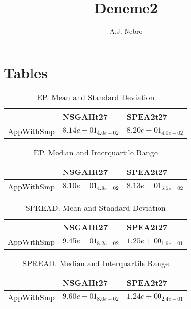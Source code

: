 \documentclass{article}
\title{Deneme2}
\author{A.J. Nebro}
\begin{document}
\maketitle
\section{Tables}

\begin{table}
\caption{EP. Mean and Standard Deviation}
\label{table: EP}
\centering
\begin{scriptsize}
\begin{tabular}{lll}
\hline & NSGAIIt27 &  SPEA2t27\\
\hline 
AppWithSmp & \cellcolor{gray95}$  8.14e-01_{ 4.0e-02}$ & \cellcolor{gray25}$  8.20e-01_{ 4.0e-02}$ \\
\hline
\end{tabular}
\end{scriptsize}
\end{table}

\begin{table}
\caption{EP. Median and Interquartile Range}
\label{table: EP}
\centering
\begin{scriptsize}
\begin{tabular}{lll}
\hline & NSGAIIt27 &  SPEA2t27\\
\hline 
AppWithSmp & \cellcolor{gray95}$  8.10e-01_{ 4.8e-02}$ & \cellcolor{gray25}$  8.13e-01_{ 5.5e-02}$ \\
\hline
\end{tabular}
\end{scriptsize}
\end{table}

\begin{table}
\caption{SPREAD. Mean and Standard Deviation}
\label{table: SPREAD}
\centering
\begin{scriptsize}
\begin{tabular}{lll}
\hline & NSGAIIt27 &  SPEA2t27\\
\hline 
AppWithSmp & \cellcolor{gray95}$  9.45e-01_{ 8.2e-02}$ & \cellcolor{gray25}$  1.25e+00_{ 1.6e-01}$ \\
\hline
\end{tabular}
\end{scriptsize}
\end{table}

\begin{table}
\caption{SPREAD. Median and Interquartile Range}
\label{table: SPREAD}
\centering
\begin{scriptsize}
\begin{tabular}{lll}
\hline & NSGAIIt27 &  SPEA2t27\\
\hline 
AppWithSmp & \cellcolor{gray95}$  9.60e-01_{ 8.0e-02}$ & \cellcolor{gray25}$  1.24e+00_{ 2.4e-01}$ \\
\hline
\end{tabular}
\end{scriptsize}
\end{table}
\end{document}
